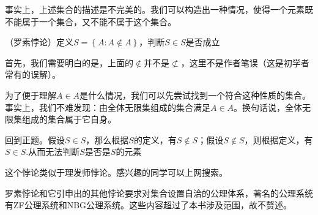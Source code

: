 事实上，上述集合的描述是不完美的。我们可以构造出一种情况，使得一个元素既不能属于一个集合，又不能不属于这个集合。

\begin{example}
    （罗素悖论）定义$S=\left\{A:A\notin A \right\}$，判断$S\in S$是否成立
\end{example}

首先，我们需要明白的是，上面的$\notin$并不是$\nsubset$，这里不是作者笔误（这是初学者常有的误解）。

为了便于理解$A \in A$是什么情况，我们可以先尝试找到一个符合这种性质的集合。事实上，我们不难发现：由全体无限集组成的集合满足$A\in A$。换句话说，全体无限集组成的集合属于它自身。

回到正题。假设$S\in S$，那么根据$S$的定义，有$S \notin S$；假设$S \notin S$，则根据定义，有$S \in S$.从而无法判断$S$是否是$S$的元素

这个悖论类似于理发师悖论。感兴趣的同学可以上网搜索。

罗素悖论和它引申出的其他悖论要求对集合设置自洽的公理体系，著名的公理系统有ZF公理系统和NBG公理系统。这些内容超过了本书涉及范围，故不赘述。